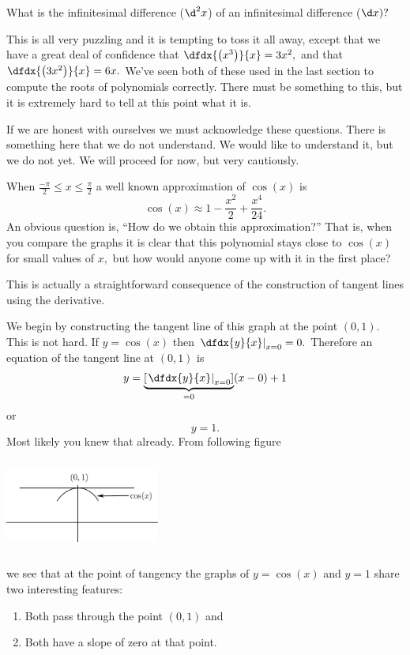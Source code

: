 What is the infinitesimal difference ($\d^2 x$) of an infinitesimal
difference ($\d x)?$ 

This is all very puzzling and it is tempting to toss it all away,
except that we have a great deal of confidence that
$\dfdx{\left(x^3\right)}{x}=3x^2,$ and that
$\dfdx{\left(3x^2\right)}{x}=6x.$ We've seen both of these used in the
last section to compute the roots of polynomials correctly. There must
be something to this, but it is extremely hard to tell at this
point what it is.

If we are honest with ourselves we must acknowledge these
questions. There is something here that we do not understand. We
would like to understand it, but we do not yet. We will proceed for
now, but very cautiously.

When $\frac{-\pi}{2}\le x\le\frac{\pi}{2}$ a well known approximation
of $\cos(x)$ is
\[
\cos(x)\approx 1-\frac{x^2}{2}+\frac{x^4}{24}.
\]
An obvious question is, ``How do we obtain this approximation?'' That
is, when you compare the graphs it is clear that this polynomial stays
close to $\cos(x)$ for small values of $x,$ but how would anyone come
up with it in the first place?

This  is actually a straightforward consequence of the 
construction of tangent lines using the derivative.

We begin by constructing the tangent line of this graph at the point
\((0,1).\) This is not hard. If
\(y=\cos(x)\) then \(\left.\dfdx{y}{x}\right|_{x=0}=0. \) Therefore an equation of the
tangent line at \((0,1)\) is
\[
y=\underbrace{\left[\left.\dfdx{y}{x}\right|_{x=0}\right]}_{=0}(x-0) +1
\]
or 
\[y=1.\]
Most likely you knew that already.
 From following figure\\[2mm]
  \centerline{\includegraphics*[height=1.2in,width=2in]{Figures/CosApprox}}
we see that at the point of tangency the graphs of \(y=\cos(x)\) and
\(y=1\) share two interesting features: 
\begin{enumerate}
\item Both pass through the point \((0,1)\) and
\item  Both have a slope of zero at that point.
\end{enumerate}

